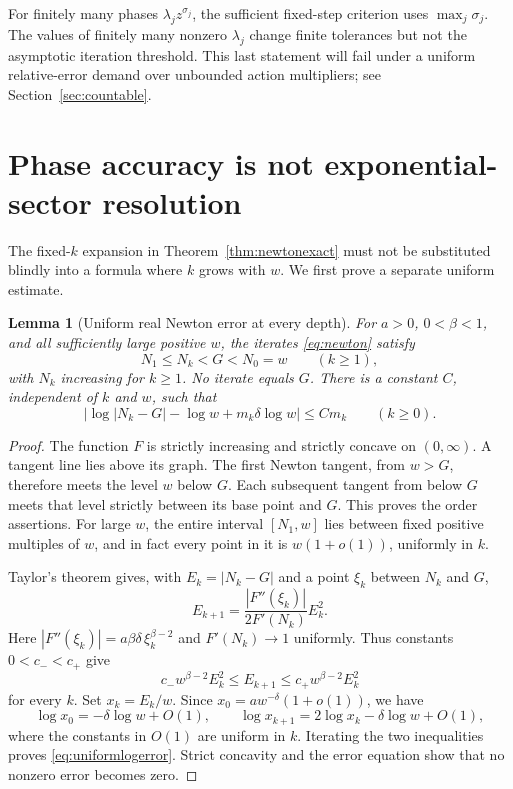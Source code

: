 \documentclass[11pt,a4paper]{article}
\newtheorem{lemma}[theorem]{Lemma}
\theoremstyle{definition}
\theoremstyle{remark}
\newcommand{\sect}[1]{Section~\ref{#1}}
\numberwithin{equation}{section}
\begin{document}
For finitely many phases $\lambda_jz^{\sigma_j}$, the sufficient fixed-step criterion uses $\max_j\sigma_j$. The values of finitely many nonzero $\lambda_j$ change finite tolerances but not the asymptotic iteration threshold. This last statement will fail under a uniform relative-error demand over unbounded action multipliers; see \sect{sec:countable}.

\section{Phase accuracy is not exponential-sector resolution}\label{sec:resolution}

The fixed-$k$ expansion in Theorem~\ref{thm:newtonexact} must not be substituted blindly into a formula where $k$ grows with $w$. We first prove a separate uniform estimate.

\begin{lemma}[Uniform real Newton error at every depth]\label{lem:uniformnewton}
For $a>0$, $0<\beta<1$, and all sufficiently large positive $w$, the iterates \eqref{eq:newton} satisfy
\[
 N_1\le N_k<G<N_0=w\qquad(k\ge1),
\]
with $N_k$ increasing for $k\ge1$. No iterate equals $G$. There is a constant $C$, independent of $k$ and $w$, such that
\begin{equation}\label{eq:uniformlogerror}
 \left|\log|N_k-G|-\log w+m_k\delta\log w\right|
 \le C m_k\qquad(k\ge0).
\end{equation}
\end{lemma}
\begin{proof}
The function $F$ is strictly increasing and strictly concave on $(0,\infty)$. A tangent line lies above its graph. The first Newton tangent, from $w>G$, therefore meets the level $w$ below $G$. Each subsequent tangent from below $G$ meets that level strictly between its base point and $G$. This proves the order assertions. For large $w$, the entire interval $[N_1,w]$ lies between fixed positive multiples of $w$, and in fact every point in it is $w(1+o(1))$, uniformly in $k$.

Taylor's theorem gives, with $E_k=|N_k-G|$ and a point $\xi_k$ between $N_k$ and $G$,
\[
 E_{k+1}=\frac{|F''(\xi_k)|}{2F'(N_k)}E_k^2.
\]
Here $|F''(\xi_k)|=a\beta\delta\,\xi_k^{\beta-2}$ and $F'(N_k)\to1$ uniformly. Thus constants $0<c_-<c_+$ give
\[
 c_-w^{\beta-2}E_k^2\le E_{k+1}\le c_+w^{\beta-2}E_k^2
\]
for every $k$. Set $x_k=E_k/w$. Since $x_0=aw^{-\delta}(1+o(1))$, we have
\[
 \log x_0=-\delta\log w+O(1),\qquad
 \log x_{k+1}=2\log x_k-\delta\log w+O(1),
\]
where the constants in $O(1)$ are uniform in $k$. Iterating the two inequalities proves \eqref{eq:uniformlogerror}. Strict concavity and the error equation show that no nonzero error becomes zero.
\end{proof}
\end{document}
